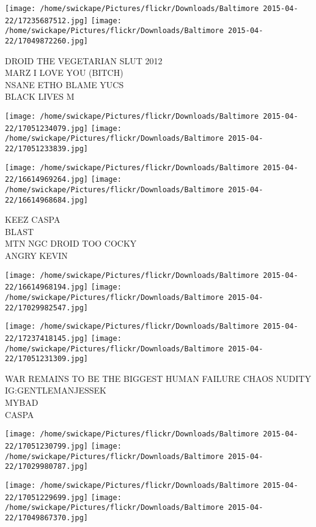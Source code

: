 \documentclass[10pt,letterpaper]{article}
\begin{document}
\texttt{[image: /home/swickape/Pictures/flickr/Downloads/Baltimore 2015-04-22/17235687512.jpg]}
\texttt{[image: /home/swickape/Pictures/flickr/Downloads/Baltimore 2015-04-22/17049872260.jpg]}

DROID THE VEGETARIAN SLUT 2012\\
MARZ I LOVE YOU (BITCH)\\
NSANE ETHO BLAME YUCS\\
BLACK LIVES M\\
\pagebreak

\texttt{[image: /home/swickape/Pictures/flickr/Downloads/Baltimore 2015-04-22/17051234079.jpg]}
\texttt{[image: /home/swickape/Pictures/flickr/Downloads/Baltimore 2015-04-22/17051233839.jpg]}

\texttt{[image: /home/swickape/Pictures/flickr/Downloads/Baltimore 2015-04-22/16614969264.jpg]}
\texttt{[image: /home/swickape/Pictures/flickr/Downloads/Baltimore 2015-04-22/16614968684.jpg]}

KEEZ CASPA\\
BLAST\\
MTN NGC DROID TOO COCKY\\
ANGRY KEVIN\\
\pagebreak

\texttt{[image: /home/swickape/Pictures/flickr/Downloads/Baltimore 2015-04-22/16614968194.jpg]}
\texttt{[image: /home/swickape/Pictures/flickr/Downloads/Baltimore 2015-04-22/17029982547.jpg]}

\texttt{[image: /home/swickape/Pictures/flickr/Downloads/Baltimore 2015-04-22/17237418145.jpg]}
\texttt{[image: /home/swickape/Pictures/flickr/Downloads/Baltimore 2015-04-22/17051231309.jpg]}

WAR REMAINS TO BE THE BIGGEST HUMAN FAILURE CHAOS NUDITY\\
IG:GENTLEMANJESSEK\\
MYBAD\\
CASPA\\
\pagebreak

\texttt{[image: /home/swickape/Pictures/flickr/Downloads/Baltimore 2015-04-22/17051230799.jpg]}
\texttt{[image: /home/swickape/Pictures/flickr/Downloads/Baltimore 2015-04-22/17029980787.jpg]}

\texttt{[image: /home/swickape/Pictures/flickr/Downloads/Baltimore 2015-04-22/17051229699.jpg]}
\texttt{[image: /home/swickape/Pictures/flickr/Downloads/Baltimore 2015-04-22/17049867370.jpg]}
\end{document}
